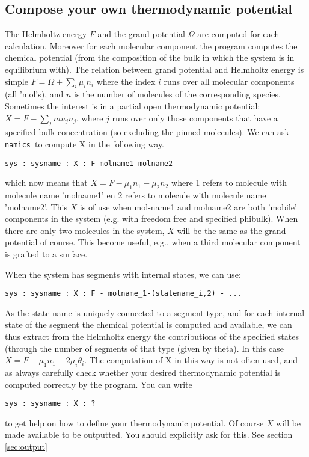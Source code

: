 \documentclass{article}
\newcommand{\namics}{{\tt namics}}
\begin{document}
\subsection{Compose your own thermodynamic potential}
\label{sec:X}
The Helmholtz energy $F$ and the grand potential $\Omega$ are computed for each calculation. Moreover for each molecular component the program computes the chemical potential (from the composition of the bulk in which the system is in equilibrium with). The relation between grand potential and Helmholtz energy is simple $F=\Omega + \sum_i \mu_i n_i$ where the index $i$ runs over all molecular components (all 'mol's), and $n$ is the number of molecules of the corresponding species.  Sometimes the interest is in a partial open thermodynamic potential: $X=F-\sum_j mu_j n_j$, where $j$ runs over only those components that have a specified bulk concentration (so excluding the pinned molecules). We can ask \namics\ to compute X in the following way.
\begin{verbatim}
sys : sysname : X : F-molname1-molname2
\end{verbatim}
which now means that $X=F-\mu_1 n_1-\mu_2 n_2$ where 1 refers to molecule with molecule name 'molname1' en 2 refers to molecule with molecule name 'molname2'. This $X$ is of use when mol-name1 and molname2 are both 'mobile' components in the system (e.g. with freedom free and specified phibulk). When there are only two molecules in the system, $X$ will be the same as the grand potential of course. This become useful, e.g., when a third molecular component is grafted to a surface. 

When the system has segments with internal states, we can use:
\begin{verbatim}
sys : sysname : X : F - molname_1-(statename_i,2) - ...
\end{verbatim}
As the state-name is uniquely connected to a segment type, and for each internal state of the segment the chemical potential is computed and available, we can thus extract from the Helmholtz energy the contributions of the specified states (through the number of segments of that type (given by theta). In this case $X=F-\mu_1 n_1-2\mu_i \theta_i$. The computation of X in this way is not often used, and as always carefully check whether your desired thermodynamic potential is computed correctly by the program. You can write 
\begin{verbatim}
sys : sysname : X : ?
\end{verbatim}
to get help on how to define your thermodynamic potential. Of course $X$ will be made available to be outputted. You should explicitly ask for this. See section \ref{sec:output} 
\end{document}
